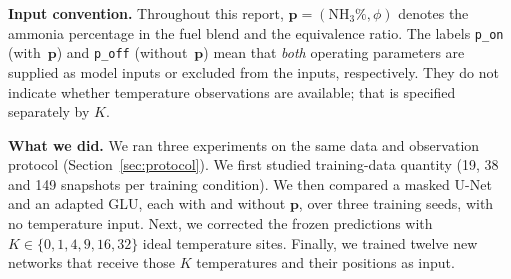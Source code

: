 \documentclass[11pt,letterpaper]{article}
\newcommand{\pon}{with~$\mathbf{p}$}
\newcommand{\poff}{without~$\mathbf{p}$}
\newcommand{\NH}{\text{NH}_3}
\begin{document}
\textbf{Input convention.} Throughout this report, $\mathbf{p}=(\NH\%,\phi)$ denotes the ammonia percentage in the fuel blend and the equivalence ratio. The labels \texttt{p\_on} (\pon) and \texttt{p\_off} (\poff) mean that \emph{both} operating parameters are supplied as model inputs or excluded from the inputs, respectively. They do not indicate whether temperature observations are available; that is specified separately by $K$.

\textbf{What we did.} We ran three experiments on the same data and observation protocol (Section~\ref{sec:protocol}). We first studied training-data quantity (19, 38 and 149 snapshots per training condition). We then compared a masked U-Net and an adapted GLU, each with and without $\mathbf{p}$, over three training seeds, with no temperature input. Next, we corrected the frozen predictions with $K\in\{0,1,4,9,16,32\}$ ideal temperature sites. Finally, we trained twelve new networks that receive those $K$ temperatures and their positions as input.
\end{document}
